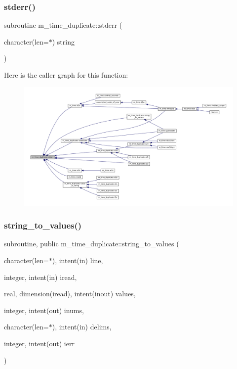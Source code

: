 \subsubsection{\texorpdfstring{stderr()}{stderr()}}
{\footnotesize\ttfamily subroutine m\+\_\+time\+\_\+duplicate\+::stderr (\begin{DoxyParamCaption}\item[{character(len=$\ast$)}]{string }\end{DoxyParamCaption})}

Here is the caller graph for this function\+:
\nopagebreak
\begin{figure}[H]
\begin{center}
\leavevmode
\includegraphics[width=350pt]{namespacem__time__duplicate_aaf5c25d7bce4f2776df6c1e586b2e277_icgraph}
\end{center}
\end{figure}
\mbox{\label{namespacem__time__duplicate_a1bfa9e4483f2452c89c0388971bb21bd}} 
\subsubsection{\texorpdfstring{string\+\_\+to\+\_\+values()}{string\_to\_values()}}
{\footnotesize\ttfamily subroutine, public m\+\_\+time\+\_\+duplicate\+::string\+\_\+to\+\_\+values (\begin{DoxyParamCaption}\item[{character(len=$\ast$), intent(in)}]{line,  }\item[{integer, intent(in)}]{iread,  }\item[{real, dimension(iread), intent(inout)}]{values,  }\item[{integer, intent(out)}]{inums,  }\item[{character(len=$\ast$), intent(in)}]{delims,  }\item[{integer, intent(out)}]{ierr }\end{DoxyParamCaption})}



